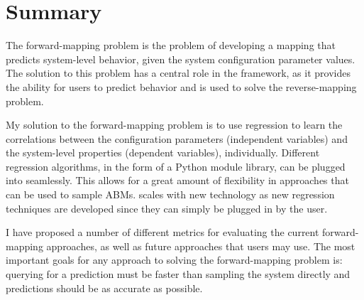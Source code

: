 
\section{Summary}

The forward-mapping problem is the problem of developing a mapping that predicts system-level behavior, given the system configuration parameter values.
The solution to this problem has a central role in the framework, as it provides the ability for users to predict behavior and is used to solve the reverse-mapping problem.

My solution to the forward-mapping problem is to use regression to learn the correlations between the configuration parameters (independent variables) and the system-level properties (dependent variables), individually.
Different regression algorithms, in the form of a Python module library, can be plugged into \fw seamlessly.
This allows for a great amount of flexibility in approaches that can be used to sample ABMs.
\fw scales with new technology as new regression techniques are developed since they can simply be plugged in by the user.

I have proposed a number of different metrics for evaluating the current forward-mapping approaches, as well as future approaches that users may use.
The most important goals for any approach to solving the forward-mapping problem is: querying for a prediction must be faster than sampling the system directly and predictions should be as accurate as possible.






